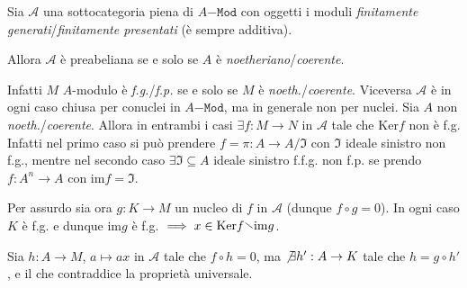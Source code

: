 \begin{example}{}
    Sia \(\mathcal{A}\) una sottocategoria piena di \(A\mathtt{-Mod}\) con
    oggetti i moduli \emph{finitamente generati}/\emph{finitamente presentati}
    (è sempre additiva).

    Allora \(\mathcal{A}\) è preabeliana se e solo se \(A\) è
    \emph{noetheriano}/\emph{coerente}.

    Infatti \(M\) \(A\)-modulo è \emph{f.g.}/\emph{f.p.} se e solo se \(M\) è \emph{noeth.}/\emph{coerente}.
    Viceversa \(\mathcal{A}\) è in ogni caso chiusa per conuclei in \(A\mathtt{-Mod}\), ma in generale non per nuclei. Sia \(A\) non \emph{noeth.}/\emph{coerente}. Allora in entrambi i casi \(\exists f : M \to N\) in \(\mathcal{A}\) tale che \(\mathrm{Ker}f\) non è f.g.
    Infatti nel primo caso si può prendere \(f = \pi : A \to A/\mathfrak{I}\) con \(\mathfrak{I}\)
    ideale sinistro non f.g., mentre nel secondo caso \(\exists  \mathfrak{I} \subseteq A \) ideale sinistro f.f.g. non f.p. se prendo \(f : A^{n} \to A\) con \(\mathrm{im}f = \mathfrak{I}\).

    Per assurdo sia ora \(g : K \to M\) un nucleo di \(f\) in \(\mathcal{A}\)
    (dunque \(f \circ g = 0\)). In ogni caso \(K\) è f.g. e dunque \(\mathrm{im}g\) è f.g. 
    \(\implies  x \in \mathrm{Ker}f \sminus \mathrm{im}g\).

    Sia \(h : A \to M\), \(a \mapsto ax\) in \(\mathcal{A}\) tale che \(f \circ h = 0\), ma \(\not
    \exists  h' : A \to K\) tale che \(h = g \circ h'\), e il che contraddice la
    proprietà universale.
\end{example}
